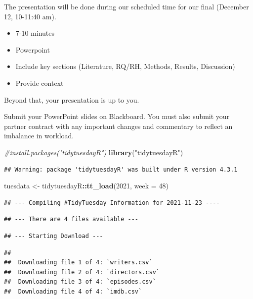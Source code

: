 \documentclass[
  b5paper]{book}
\newenvironment{Shaded}{\begin{snugshade}}{\end{snugshade}}
\newcommand{\AttributeTok}[1]{\textcolor[rgb]{0.13,0.29,0.53}{#1}}
\newcommand{\CommentTok}[1]{\textcolor[rgb]{0.56,0.35,0.01}{\textit{#1}}}
\newcommand{\DecValTok}[1]{\textcolor[rgb]{0.00,0.00,0.81}{#1}}
\newcommand{\FunctionTok}[1]{\textcolor[rgb]{0.13,0.29,0.53}{\textbf{#1}}}
\newcommand{\NormalTok}[1]{#1}
\newcommand{\OtherTok}[1]{\textcolor[rgb]{0.56,0.35,0.01}{#1}}
\newcommand{\SpecialCharTok}[1]{\textcolor[rgb]{0.81,0.36,0.00}{\textbf{#1}}}
\newcommand{\StringTok}[1]{\textcolor[rgb]{0.31,0.60,0.02}{#1}}
\begin{document}
The presentation will be done during our scheduled time for our final (December 12, 10-11:40 am).~

\begin{itemize}
\item
  7-10 minutes
\item
  Powerpoint
\item
  Include key sections (Literature, RQ/RH, Methods, Results, Discussion)
\item
  Provide context
\end{itemize}

Beyond that, your presentation is up to you.

Submit your PowerPoint slides on Blackboard. You must also submit your partner contract with any important changes and commentary to reflect an imbalance in workload.

\begin{Shaded}
\begin{Highlighting}[]
\CommentTok{\#install.packages("tidytuesdayR")}
\FunctionTok{library}\NormalTok{(}\StringTok{"tidytuesdayR"}\NormalTok{)}
\end{Highlighting}
\end{Shaded}

\begin{verbatim}
## Warning: package 'tidytuesdayR' was built under R version 4.3.1
\end{verbatim}

\begin{Shaded}
\begin{Highlighting}[]
\NormalTok{tuesdata }\OtherTok{\textless{}{-}}\NormalTok{ tidytuesdayR}\SpecialCharTok{::}\FunctionTok{tt\_load}\NormalTok{(}\DecValTok{2021}\NormalTok{, }\AttributeTok{week =} \DecValTok{48}\NormalTok{)}
\end{Highlighting}
\end{Shaded}

\begin{verbatim}
## --- Compiling #TidyTuesday Information for 2021-11-23 ----
\end{verbatim}

\begin{verbatim}
## --- There are 4 files available ---
\end{verbatim}

\begin{verbatim}
## --- Starting Download ---
\end{verbatim}

\begin{verbatim}
## 
##  Downloading file 1 of 4: `writers.csv`
##  Downloading file 2 of 4: `directors.csv`
##  Downloading file 3 of 4: `episodes.csv`
##  Downloading file 4 of 4: `imdb.csv`
\end{verbatim}
\end{document}
